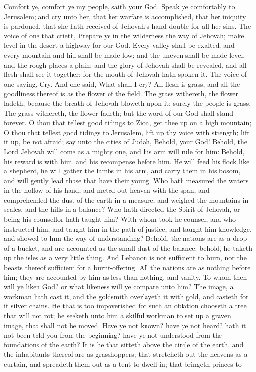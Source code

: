 Comfort ye, comfort ye my people, saith your God. Speak ye comfortably to Jerusalem; and cry unto her, that her warfare is accomplished, that her iniquity is pardoned, that she hath received of Jehovah’s hand double for all her sins.  The voice of one that crieth, Prepare ye in the wilderness the way of Jehovah; make level in the desert a highway for our God. Every valley shall be exalted, and every mountain and hill shall be made low; and the uneven shall be made level, and the rough places a plain: and the glory of Jehovah shall be revealed, and all flesh shall see it together; for the mouth of Jehovah hath spoken it.  The voice of one saying, Cry. And one said, What shall I cry? All flesh is grass, and all the goodliness thereof is as the flower of the field. The grass withereth, the flower fadeth, because the breath of Jehovah bloweth upon it; surely the people is grass. The grass withereth, the flower fadeth; but the word of our God shall stand forever.  O thou that tellest good tidings to Zion, get thee up on a high mountain; O thou that tellest good tidings to Jerusalem, lift up thy voice with strength; lift it up, be not afraid; say unto the cities of Judah, Behold, your God! Behold, the Lord Jehovah will come as a mighty one, and his arm will rule for him: Behold, his reward is with him, and his recompense before him. He will feed his flock like a shepherd, he will gather the lambs in his arm, and carry them in his bosom, and will gently lead those that have their young.  Who hath measured the waters in the hollow of his hand, and meted out heaven with the span, and comprehended the dust of the earth in a measure, and weighed the mountains in scales, and the hills in a balance? Who hath directed the Spirit of Jehovah, or being his counsellor hath taught him? With whom took he counsel, and who instructed him, and taught him in the path of justice, and taught him knowledge, and showed to him the way of understanding? Behold, the nations are as a drop of a bucket, and are accounted as the small dust of the balance: behold, he taketh up the isles as a very little thing. And Lebanon is not sufficient to burn, nor the beasts thereof sufficient for a burnt-offering. All the nations are as nothing before him; they are accounted by him as less than nothing, and vanity.  To whom then will ye liken God? or what likeness will ye compare unto him? The image, a workman hath cast it, and the goldsmith overlayeth it with gold, and casteth for it silver chains. He that is too impoverished for such an oblation chooseth a tree that will not rot; he seeketh unto him a skilful workman to set up a graven image, that shall not be moved. Have ye not known? have ye not heard? hath it not been told you from the beginning? have ye not understood from the foundations of the earth? It is he that sitteth above the circle of the earth, and the inhabitants thereof are as grasshoppers; that stretcheth out the heavens as a curtain, and spreadeth them out as a tent to dwell in; that bringeth princes to 
